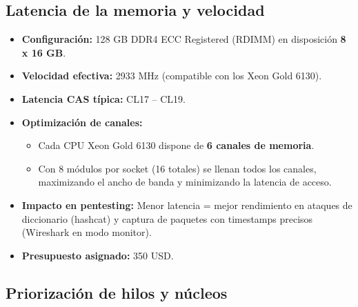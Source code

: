 \documentclass[12pt, letterpaper]{article}
\begin{document}
\subsection{Latencia de la memoria y velocidad}

\begin{itemize}
    \item \textbf{Configuración:} 128 GB DDR4 ECC Registered (RDIMM) en disposición \textbf{8 x 16 GB}.
    \item \textbf{Velocidad efectiva:} 2933 MHz (compatible con los Xeon Gold 6130).
    \item \textbf{Latencia CAS típica:} CL17 – CL19.
    \item \textbf{Optimización de canales:}
        \begin{itemize}
            \item Cada CPU Xeon Gold 6130 dispone de \textbf{6 canales de memoria}.
            \item Con 8 módulos por socket (16 totales) se llenan todos los canales, maximizando el ancho de banda y minimizando la latencia de acceso.
        \end{itemize}
    \item \textbf{Impacto en pentesting:} Menor latencia = mejor rendimiento en ataques de diccionario (hashcat) y captura de paquetes con timestamps precisos (Wireshark en modo monitor).
    \item \textbf{Presupuesto asignado:} 350 USD.
\end{itemize}

\subsection{Priorización de hilos y núcleos}
\end{document}
